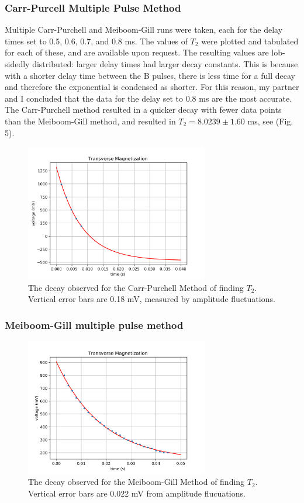 \documentclass[]{report}
\begin{document}
\subsubsection{Carr-Purcell Multiple Pulse Method}

Multiple Carr-Purchell and Meiboom-Gill runs were taken, each for the delay times set to 0.5, 0.6, 0.7, and 0.8 ms. The values of $T_{2}$ were plotted and tabulated for each of these, and are available upon request. The resulting values are lob-sidedly distributed: larger delay times had larger decay constants. This is because with a shorter delay time between the B pulses, there is less time for a full decay and therefore the exponential is condensed as shorter. For this reason, my partner and I concluded that the data for the delay set to 0.8 ms are the most accurate. The Carr-Purchell method resulted in a quicker decay with fewer data points than the Meiboom-Gill method, and resulted in $T_{2} = 8.0239 \pm 1.60 $ ms, see (Fig. 5).

\begin{figure}[h]

\centering
\includegraphics[width=8cm]{Carr} 

\caption{The decay observed for the Carr-Purchell Method of finding $T_{2}$. Vertical error bars are 0.18 mV, measured by amplitude fluctuations.}
\end{figure}

\subsubsection{Meiboom-Gill multiple pulse method}

\begin{figure}[h]

\centering
\includegraphics[width=8cm]{Mei} 

\caption{The decay observed for the Meiboom-Gill Method of finding $T_{2}$. Vertical error bars are 0.022 mV from amplitude flucuations.}
\end{figure}
\end{document}

